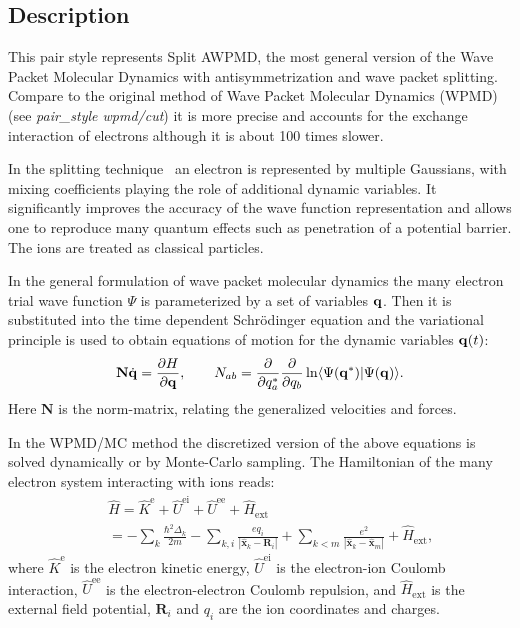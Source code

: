 \documentclass[a4paper,12pt]{article}
\begin{document}
\subsection*{Description}

This pair style represents Split AWPMD, the most general version of the Wave Packet Molecular Dynamics with antisymmetrization and wave packet splitting. Compare to the original method of Wave Packet Molecular Dynamics (WPMD) (see \textsl{pair\_style wpmd/cut}) it is more precise and accounts for the exchange interaction of electrons although it is about 100 times slower.

In the splitting technique~\cite{Morozov:CPP12} an electron is represented by multiple
Gaussians, with mixing coefficients playing the role of additional dynamic
variables. It significantly improves the
accuracy of the wave function representation and
allows one to
reproduce many quantum effects such as penetration of a potential barrier.
The ions are treated as classical particles. 

In the general formulation of wave packet molecular dynamics the many electron trial wave function
$\Psi$ is parameterized by a set of variables ${\bf q}$. Then
it is substituted into the time dependent Schr\"odinger equation and the
variational principle is used to obtain equations of motion for the dynamic
variables ${\bf q}(t)$:
\begin{equation}\label{EqMotion}
\mathbf{N}\dot{{\bf q}}=\frac{\partial H}{\partial {\bf q}},\qquad
N_{ab}=\frac{\partial}{\partial q^*_a}
\frac{\partial}{\partial q_b}\ln\langle\Psi({\bf q}^*)|\Psi({\bf q})\rangle.
\end{equation}
Here $\mathbf{N}$ is the norm-matrix, relating the generalized velocities and
forces.

In the WPMD/MC method the discretized version of the above
equations is solved dynamically or by Monte-Carlo sampling.
The Hamiltonian of the many electron system interacting
with ions reads:
\begin{eqnarray}\label{Hoperator}
&&\hat{H}=\hat{K}^\mathrm{e}+\hat{U}^\mathrm{ei}+\hat{U}^\mathrm{ee}+\hat H_\mathrm{ext}\nonumber \\
&&= - \sum_k\frac{\hbar^2\Delta_k}{2m}
- \sum_{k,i}\frac{eq_i}{|\hat{\mathbf{x}}_k-\mathbf{R}_i|}
+ \sum_{k<m}\frac{e^2}{|\hat{\mathbf{x}}_k-\hat{\mathbf{x}}_m|}
+ \hat H_\mathrm{ext},
\end{eqnarray}
where $\hat{K}^\mathrm{e}$ is the electron kinetic energy, $\hat{U}^\mathrm{ei}$ is the
electron-ion Coulomb interaction, $\hat{U}^\mathrm{ee}$ is the electron-electron
Coulomb repulsion, and $\hat H_\mathrm{ext}$ is the external field potential,
$\mathbf{R}_i$ and $q_i$ are the ion coordinates and charges.
\end{document}
